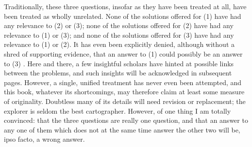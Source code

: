 Traditionally, these three questions, insofar as they have been treated at all, have been treated as wholly unrelated. None of the solutions offered for (1) have had any relevance to (2) or (3); none of the solu\-tions offered for (2) have had any relevance to (1) or (3); and none of the solutions offered for (3) have had any relevance to (1) or (2). It has even been explicitly denied, although without a shred of support\-ing evidence, that an answer to (1) could possibly be an answer to (3) \citep{Sankoff1979}. Here and there, a few insightful scholars have hinted at possible links between the problems, and such insights will be ac\-knowledged in subsequent pages. However, a single, unified treatment has never even been attempted, and this book, whatever its short\-comings, may therefore claim at least some measure of originality. Doubtless many of its details will need revision or replacement; the explorer is seldom the best cartographer. However, of one thing I am totally convinced: that the three questions are really one question, and that an answer to any one of them which does not at the same time answer the other two will be, ipso facto, a wrong answer.

